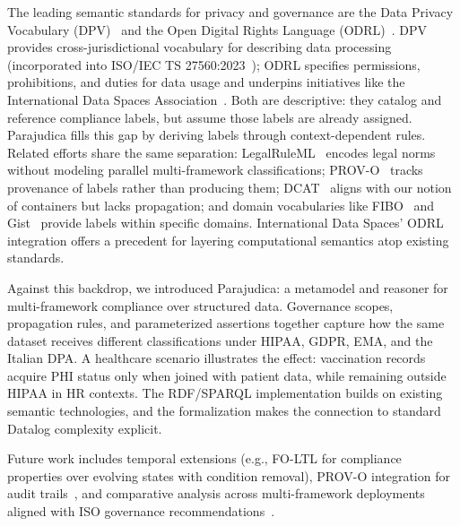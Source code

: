 \documentclass[runningheads,oneside]{llncs}
\begin{document}
The leading semantic standards for privacy and governance are the Data Privacy Vocabulary (DPV)~\cite{pandit2019dpv} and the Open Digital Rights Language (ODRL)~\cite{odrl-model-2018,odrl-vocab-2018}. DPV provides cross-jurisdictional vocabulary for describing data processing (incorporated into ISO/IEC TS 27560:2023~\cite{iso27560}); ODRL specifies permissions, prohibitions, and duties for data usage and underpins initiatives like the International Data Spaces Association~\cite{bader2020}. Both are descriptive: they catalog and reference compliance labels, but assume those labels are already assigned. Parajudica fills this gap by deriving labels through context-dependent rules. Related efforts share the same separation: LegalRuleML~\cite{legalruleml} encodes legal norms without modeling parallel multi-framework classifications; PROV-O~\cite{prov-o} tracks provenance of labels rather than producing them; DCAT~\cite{dcat} aligns with our notion of containers but lacks propagation; and domain vocabularies like FIBO~\cite{fibo} and Gist~\cite{gist} provide labels within specific domains. International Data Spaces' ODRL integration offers a precedent for layering computational semantics atop existing standards. 

Against this backdrop, we introduced Parajudica: a metamodel and reasoner for multi-framework compliance over structured data. Governance scopes, propagation rules, and parameterized assertions together capture how the same dataset receives different classifications under HIPAA, GDPR, EMA, and the Italian DPA. A healthcare scenario illustrates the effect: vaccination records acquire PHI status only when joined with patient data, while remaining outside HIPAA in HR contexts. The RDF/SPARQL implementation builds on existing semantic technologies, and the formalization makes the connection to standard Datalog complexity explicit.

Future work includes temporal extensions (e.g., FO-LTL for compliance properties over evolving states with condition removal), PROV-O integration for audit trails~\cite{prov-o}, and comparative analysis across multi-framework deployments aligned with ISO governance recommendations~\cite{iso19944,iso38505,iso27001}.

\newpage


\end{document}
